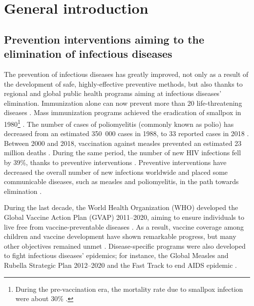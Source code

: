 \chapter{General introduction} 
\label{Introduction} 


\section{Prevention interventions aiming to the elimination of infectious diseases}
\label{Intro:Prevention}

The prevention of infectious diseases has greatly improved, not only as a result of the development of safe, highly-effective preventive %
methods, but also thanks to regional and global public health programs aiming at infectious diseases' elimination. Immunization alone can now prevent more than 20 life-threatening diseases \cite[]{WHO_IA2030}. Mass immunization programs achieved the eradication of smallpox in 1980\footnote{During the pre-vaccination era, the mortality rate due to smallpox infection were about 30\% \cite[]{CDC_Smallpox2001}.} \cite[]{CDC_Smallpox2001}. The number of cases of poliomyelitis (commonly known as polio) has decreased from an estimated 350~000 cases in 1988, to 33 reported cases in 2018 \cite[]{WHO_Factsheet_Polio}. %
Between 2000 and 2018, vaccination against measles prevented an estimated 23 million deaths \cite[]{WHO_Factsheet_Measles}. During the same period, the number of new HIV infections fell by 39\%, thanks to preventive interventions \cite[]{WHO_Factsheet_HIV}. Preventive interventions have decreased the overall number of new infections worldwide \cite[]{CDC_10achievements} and placed some communicable diseases, such as measles and poliomyelitis, in the path towards elimination \cite[]{CDC_10achievements}. 
 
During the last decade, the World Health Organization (WHO) developed the Global Vaccine Action Plan (GVAP) 2011--2020, aiming to ensure individuals to live free from vaccine-preventable diseases \cite[]{GVAP_Review2020}. As a result, vaccine coverage among children and vaccine development have shown remarkable progress, but many other objectives remained unmet \cite[]{GVAP_Review2020}. Disease-specific programs were also developed to fight infectious diseases' epidemics; for instance, the Global Measles and Rubella Strategic Plan 2012--2020 \cite[]{WHO_MR2012} and the Fast Track to end AIDS epidemic \cite[]{UNAIDS_EndAIDS2011}. 

